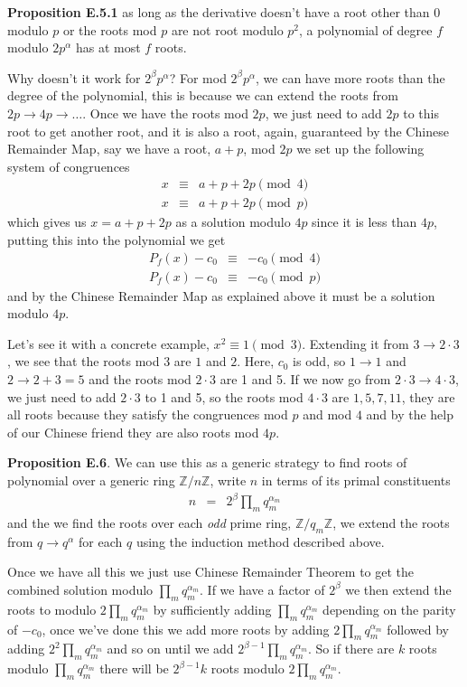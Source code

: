 \documentclass[aps,preprint,preprintnumbers,nofootinbib,showpacs,prd]{revtex4-1}
\newcommand{\nbea}{\begin{eqnarray*}}
\newcommand{\neea}{\end{eqnarray*}}
\begin{document}
{\bf Proposition E.5.1} as long as the derivative doesn't have a root other than 0 modulo $p$ or the roots mod $p$ are not root modulo $p^2$, a polynomial of degree $f$ modulo $2p^\alpha$ has at most $f$ roots.

Why doesn't it work for $2^\beta p^\alpha$? For mod $2^\beta p^\alpha$, we can have more roots than the degree of the polynomial, this is because we can extend the roots from $2p \to 4p \to \dots$. Once we have the roots mod $2p$, we just need to add $2p$ to this root to get another root, and it is also a root, again, guaranteed by the Chinese Remainder Map, say we have a root, $a + p$, mod $2p$ we set up the following system of congruences
%
\nbea
x & \equiv & a + p + 2p \pmod{4} \\
x & \equiv & a + p + 2p \pmod{p}
\neea
%
which gives us $x = a + p + 2p$ as a solution modulo $4p$ since it is less than $4p$, putting this into the polynomial we get
%
\nbea
P_f(x) - c_0 & \equiv & -c_0 \pmod{4} \\
P_f(x) - c_0 & \equiv & -c_0 \pmod{p}
\neea
%
and by the Chinese Remainder Map as explained above it must be a solution modulo $4p$.

Let's see it with a concrete example, $x^2 \equiv 1 \pmod{3}$. Extending it from $3 \to 2\cdot 3$, we see that the roots mod 3 are $1$ and $2$. Here, $c_0$ is odd, so $1 \to 1$ and $2 \to 2+3 = 5$ and the roots mod $2\cdot 3$ are 1 and 5. If we now go from $2\cdot 3 \to 4\cdot 3$, we just need to add $2\cdot 3$ to 1 and 5, so the roots mod $4\cdot 3$ are $1, 5, 7, 11$, they are all roots because they satisfy the congruences mod $p$ and mod $4$ and by the help of our Chinese friend they are also roots mod $4p$.

{\bf Proposition E.6}. We can use this as a generic strategy to find roots of polynomial over a generic ring $\mathbb{Z}/n\mathbb{Z}$, write $n$ in terms of its primal constituents 
%
\nbea
n & = & 2^\beta \prod_m q_m^{\alpha_m}
\neea
%
and the we find the roots over each {\it odd} prime ring, $\mathbb{Z}/q_m\mathbb{Z}$, we extend the roots from $q \to q^{\alpha}$ for each $q$ using the induction method described above.

Once we have all this we just use Chinese Remainder Theorem to get the combined solution modulo $\prod_m q_m^{\alpha_m}$. If we have a factor of $2^\beta$ we then extend the roots to modulo $2\prod_m q_m^{\alpha_m}$ by sufficiently adding $\prod_m q_m^{\alpha_m}$ depending on the parity of $-c_0$, once we've done this we add more roots by adding $2\prod_m q_m^{\alpha_m}$ followed by adding $2^2\prod_m q_m^{\alpha_m}$ and so on until we add $2^{\beta-1}\prod_m q_m^{\alpha_m}$. So if there are $k$ roots modulo $\prod_m q_m^{\alpha_m}$ there will be $2^{\beta-1} k$ roots modulo $2\prod_m q_m^{\alpha_m}$.
\end{document}
